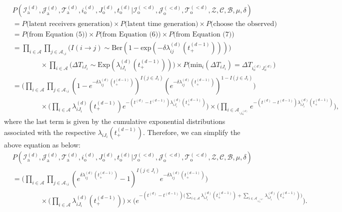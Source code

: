 \documentclass[a4paper]{article}
\begin{document}
  \begin{equation}
  \begin{aligned}
&P(\mathcal{I}^{(d)}_{\mbox{a}}, \mathcal{J}^{(d)}_{\mbox{a}}, \mathcal{T}^{(d)}_{\mbox{a}}, i^{(d)}_{\mbox{o}}, J^{(d)}_{\mbox{o}}, t^{(d)}_{\mbox{o}} |\mathcal{I}^{(<d)}_{\mbox{o}}, \mathcal{J}^{(<d)}_{\mbox{o}}, \mathcal{T}^{(<d)}_{\mbox{o}}, \mathcal{Z}, \mathcal{C}, \mathcal{B}, \mu, \delta)\\&=P\Big(\mbox{latent receivers generation}\Big) \times P\Big(\mbox{latent time generation}\Big)\times P\Big(\mbox{choose the observed}\Big) \\&=P\Big(\mbox{from Equation (5)}\Big) \times P\Big(\mbox{from Equation (6)}\Big)\times P\Big(\mbox{from Equation (7)}\Big) \\&
=\prod_{i\in \mathcal{A}}\prod_{j\in \mathcal{A}_{\backslash i}}\Big(I(i \rightarrow j)\sim \mbox{Ber}(1-\mbox{exp}(-\delta\lambda^{(d)}_{ij}(t_+^{(d-1)})))\Big) \\&\quad\quad\quad\quad\times \prod_{i\in \mathcal{A}}\Big(\Delta T_{iJ_i}\sim\mbox{Exp}(\lambda^{(d)}_{iJ_i}(t_+^{(d-1)}))\Big) \times P\Big(\mbox{min}_i (\Delta T_{i{J_i}}) = \Delta T_{i_{o}^{(d)}{J_{o}^{(d)}}}\Big)\\&
=\Big(\prod_{i\in \mathcal{A}}\prod_{j \in \mathcal{A}_{\backslash i }} (1-e^{-\delta\lambda^{(d)}_{ij}(t_+^{(d-1)})})^{I(j \in J_i)}(e^{-\delta\lambda^{(d)}_{ij}(t_+^{(d-1)})})^{1-I(j \in J_i)}\Big)\\&\quad\quad\quad\quad\times \Big(\prod_{i\in \mathcal{A}}\lambda^{(d)}_{iJ_i}(t_+^{(d-1)})e^{-(t^{(d)}-t^{(d-1)})\lambda^{(d)}_{iJ_i}(t_+^{(d-1)})}\Big)\times \Big(\prod_{i\in \mathcal{A}_{\backslash i_o^{(d)}}}e^{-(t^{(d)}-t^{(d-1)})\lambda^{(d)}_{i{J_i}}(t_+^{(d-1)})}\Big),
  \end{aligned}
  \end{equation}
  where the last term is given by the cumulative exponential distributions associated with the respective $\lambda_{iJ_i}(t_+^{(d-1)})$. Therefore, we can simplify the above equation as below:
  \begin{equation}
  \begin{aligned}
  &P(\mathcal{I}^{(d)}_{\mbox{a}}, \mathcal{J}^{(d)}_{\mbox{a}}, \mathcal{T}^{(d)}_{\mbox{a}}, i^{(d)}_{\mbox{o}}, J^{(d)}_{\mbox{o}}, t^{(d)}_{\mbox{o}} |\mathcal{I}^{(<d)}_{\mbox{o}}, \mathcal{J}^{(<d)}_{\mbox{o}}, \mathcal{T}^{(<d)}_{\mbox{o}}, \mathcal{Z}, \mathcal{C}, \mathcal{B}, \mu, \delta)\\&=\Big(\prod_{i\in \mathcal{A}}\prod_{j \in \mathcal{A}_{\backslash i }} (e^{\delta\lambda^{(d)}_{ij}(t_+^{(d-1)})}-1)^{I(j \in J_i)}e^{-\delta\lambda^{(d)}_{ij}(t_+^{(d-1)})}\Big)\\&\quad\quad\quad\quad \times \Big(\prod_{i\in \mathcal{A}} \lambda^{(d)}_{iJ_i}(t_+^{(d-1)})\Big)\times \Big(e^{-(t^{(d)}-t^{(d-1)})\big(\sum\limits_{i \in \mathcal{A}}\lambda^{(d)}_{i{J_i}}(t_+^{(d-1)})+\sum\limits_{i \in \mathcal{A}_{\backslash i_o^{(d)}}}\lambda^{(d)}_{i{J_i}}(t_+^{(d-1)})\big)}\Big).
  \end{aligned}
  \end{equation}
\end{document}
